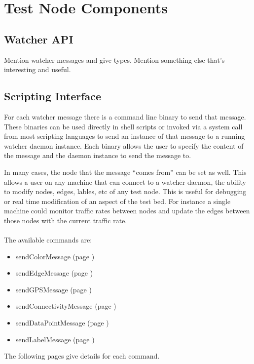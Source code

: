\documentclass{article}
\begin{document}
\section{Test Node Components}
\subsection{Watcher API}
Mention watcher messages and give types. Mention something else that's interesting and useful. 

\subsection{Scripting Interface}
For each watcher message there is a command line binary to send that message. These binaries can be used directly in shell scripts or invoked via a system call from most scripting languages to send 
an instance of that message to a running watcher daemon instance. Each binary allows the user to specify the content of the message and the daemon instance to send the message to. 

In many cases, the node that the message ``comes from'' can be set as well. This allows a user on any machine that can connect to a watcher daemon, the ability to modify nodes, edges, lables, etc of any 
test node. This is useful for debugging or real time modification of an aspect of the test bed. For instance a single machine could monitor traffic rates between nodes and update 
the edges between those nodes with the current traffic rate. 
\\\\
The available commands are:
\begin{itemize}
\item sendColorMessage (page \pageref{sendColorMessage})
\item sendEdgeMessage (page \pageref{sendEdgeMessage})
\item sendGPSMessage (page \pageref{sendGPSMessage})
\item sendConnectivityMessage (page \pageref{sendConnectivityMessage})
\item sendDataPointMessage (page \pageref{sendDataPointMessage})
\item sendLabelMessage (page \pageref{sendLabelMessage})
\end{itemize}
The following pages give details for each command.






\end{document}

